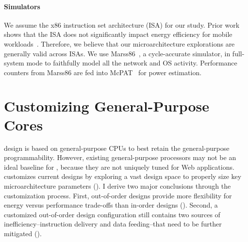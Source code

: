 \paragraph{Simulators} We assume the x86 instruction set architecture (ISA) for our study. Prior work shows that the ISA does not significantly impact energy efficiency for mobile workloads~\cite{risc-cisc}. Therefore, we believe that our microarchitecture explorations are generally valid across ISAs. We use Marss86~\cite{marss}, a cycle-accurate simulator, in full-system mode to faithfully model all the network and OS activity. Performance counters from Marss86 are fed into McPAT~\cite{mcpat} for power estimation.


\section{Customizing General-Purpose Cores}
\label{sec:arch:customization}

\webcore design is based on general-purpose CPUs to best retain the general-purpose programmability. However, existing general-purpose processors may not be an ideal baseline for \webcore, because they are not uniquely tuned for Web applications. \webcore customizes current designs by exploring a vast design space to properly size key microarchitecture parameters (). I derive two major conclusions through the customization process. First, out-of-order designs provide more flexibility for energy versus performance trade-offs than in-order designs (). Second, a customized out-of-order design configuration still contains two sources of inefficiency--instruction delivery and data feeding--that need to be further mitigated ().

